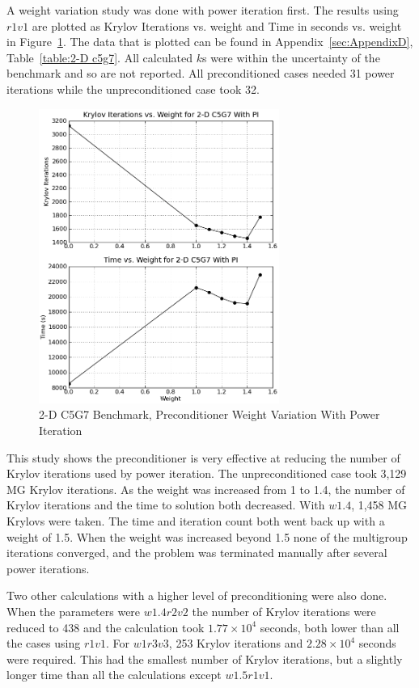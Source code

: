A weight variation study was done with power iteration first. The results using $r1v1$ are plotted as Krylov Iterations vs. weight and Time in seconds vs. weight in Figure~\ref{fig:2-Dc5g7PI}. The data that is plotted can be found in Appendix~\ref{sec:AppendixD}, Table~\ref{table:2-D c5g7}. All calculated $k$s were within the uncertainty of the benchmark and so are not reported. All preconditioned cases needed 31 power iterations while the unpreconditioned case took 32.
%
\begin{figure}[!ht]
    \begin{center}
      \includegraphics [width=0.7\textwidth, height=0.7\textheight] {2dc5g7PI}
   \end{center}
   \caption{2-D C5G7 Benchmark, Preconditioner Weight Variation With Power Iteration}
   \label{fig:2-Dc5g7PI}
\end{figure}

This study shows the preconditioner is very effective at reducing the number of Krylov iterations used by power iteration. The unpreconditioned case took 3,129 MG Krylov iterations. As the weight was increased from 1 to 1.4, the number of Krylov iterations and the time to solution both decreased. With $w1.4$, 1,458 MG Krylovs were taken. The time and iteration count both went back up with a weight of 1.5. When the weight was increased beyond 1.5 none of the multigroup iterations converged, and the problem was terminated manually after several power iterations. 

Two other calculations with a higher level of preconditioning were also done. When the parameters were $w1.4r2v2$ the number of Krylov iterations were reduced to 438 and the calculation took $1.77 \times 10^{4}$ seconds, both lower than all the cases using $r1v1$. For $w1r3v3$, 253 Krylov iterations and $2.28 \times 10^{4}$ seconds were required. This had the smallest number of Krylov iterations, but a slightly longer time than all the calculations except $w1.5r1v1$.	

